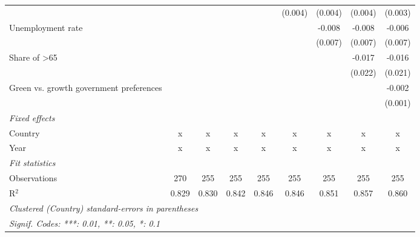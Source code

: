 \begin{table}[htbp]
\begin{tabular}{lcccccccc}
                                                                 &         &         &         &              & (0.004)      & (0.004)      & (0.004)       & (0.003)\\   
      Unemployment rate                                          &         &         &         &              &              & -0.008       & -0.008        & -0.006\\   
                                                                 &         &         &         &              &              & (0.007)      & (0.007)       & (0.007)\\   
      Share of >65                                               &         &         &         &              &              &              & -0.017        & -0.016\\   
                                                                 &         &         &         &              &              &              & (0.022)       & (0.021)\\   
      Green vs. growth government preferences                    &         &         &         &              &              &              &               & -0.002\\   
                                                                 &         &         &         &              &              &              &               & (0.001)\\   
      \emph{Fixed effects}\\
      Country                                                    & x       & x       & x       & x            & x            & x            & x             & x\\  
      Year                                                       & x       & x       & x       & x            & x            & x            & x             & x\\  
      \midrule \emph{Fit statistics}\\
      Observations                                               & 270     & 255     & 255     & 255          & 255          & 255          & 255           & 255\\  
      R$^2$                                                      & 0.829   & 0.830   & 0.842   & 0.846        & 0.846        & 0.851        & 0.857         & 0.860\\  
      \midrule
      \multicolumn{9}{l}{\emph{Clustered (Country) standard-errors in parentheses}}\\
      \multicolumn{9}{l}{\emph{Signif. Codes: ***: 0.01, **: 0.05, *: 0.1}}\\
   \end{tabular}
\end{table}


